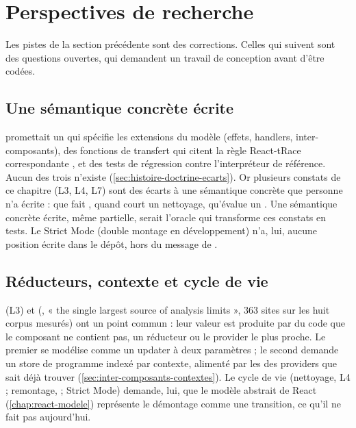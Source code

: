 \section{Perspectives de recherche}
\label{sec:limites-perspectives-recherche}

Les pistes de la section précédente sont des corrections. Celles qui suivent sont des questions ouvertes, qui demandent un travail de conception avant d'être codées.

\subsection{Une sémantique concrète écrite}

 promettait un  qui spécifie les extensions du modèle (effets, handlers, inter-composants), des fonctions de transfert qui citent la règle React-tRace correspondante \cite{LeeAhnYi2025}, et des tests de régression contre l'interpréteur de référence. Aucun des trois n'existe (\cref{sec:histoire-doctrine-ecarts}). Or plusieurs constats de ce chapitre (L3, L4, L7) sont des écarts à une sémantique concrète que personne n'a écrite : que fait , quand court un nettoyage, qu'évalue un . Une sémantique concrète écrite, même partielle, serait l'oracle qui transforme ces constats en tests. Le Strict Mode (double montage en développement) n'a, lui, aucune position écrite dans le dépôt, hors du message de .

\subsection{Réducteurs, contexte et cycle de vie}

 (L3) et  (, « the single largest source of analysis limits », 363 sites sur les huit corpus mesurés) ont un point commun : leur valeur est produite par du code que le composant ne contient pas, un réducteur ou le provider le plus proche. Le premier se modélise comme un updater à deux paramètres ; le second demande un store de programme indexé par contexte, alimenté par les  des providers que  sait déjà trouver (\cref{sec:inter-composants-contextes}). Le cycle de vie (nettoyage, L4 ; remontage,  ; Strict Mode) demande, lui, que le modèle abstrait de React (\cref{chap:react-modele}) représente le démontage comme une transition, ce qu'il ne fait pas aujourd'hui.

